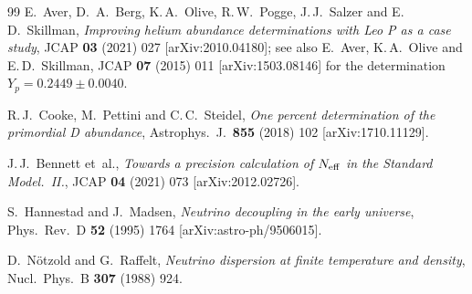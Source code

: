 \documentclass[a4paper,11pt]{article}
\newcommand{\Yp}{Y_p}
\newcommand{\Neff}{N_{\rm eff}}
\begin{document}
\begin{thebibliography}{99}
E.~Aver, D.~A.~Berg, K.\,A.~Olive, R.\,W.~Pogge, J.\,J.~Salzer and E.\,D.~Skillman,
\textit{Improving helium abundance determinations with Leo P as a case study},
JCAP \textbf{03} (2021) 027 [arXiv:2010.04180];
see also E.~Aver, K.\,A.~Olive and E.\,D.~Skillman,
JCAP \textbf{07} (2015) 011 [arXiv:1503.08146]
for the determination $\Yp = 0.2449 \pm 0.0040$.

R.\,J.~Cooke, M.~Pettini and C.\,C.~Steidel,
\textit{One percent determination of the primordial D abundance},
Astrophys.\ J.\ \textbf{855} (2018) 102 [arXiv:1710.11129].

J.\,J.~Bennett et~al.,
\textit{Towards a precision calculation of $\Neff$ in the Standard Model.~II.},
JCAP \textbf{04} (2021) 073 [arXiv:2012.02726].

S.~Hannestad and J.~Madsen,
\textit{Neutrino decoupling in the early universe},
Phys.\ Rev.\ D \textbf{52} (1995) 1764 [arXiv:astro-ph/9506015].

D.~N\"otzold and G.~Raffelt,
\textit{Neutrino dispersion at finite temperature and density},
Nucl.\ Phys.\ B \textbf{307} (1988) 924.

\end{thebibliography}
\end{document}
